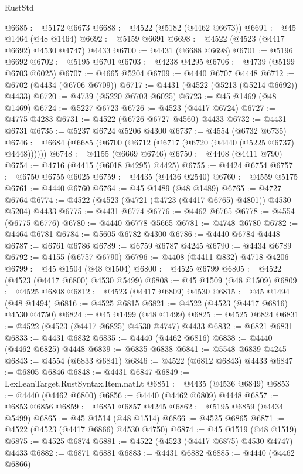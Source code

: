 \begin{lexlean}{RustStd}
\begin{coremodule}
{\begin{coremodule}
{{{{{{{{{{{{{{{{{{{{{{{{{{{{{{{{{{{{{{{{{{{{{{{{{{{{{{{{{{{{@6685 := @5172 @6673
@6688 := @4522 (@5182 (@4462 @6673))
@6691 := @45 @1464 (@48 @1464)
@6692 := @5159 @6691
@6698 := @4522 (@4523 (@4417 @6692) @4530 @4747) @4433
@6700 := @4431 (@6688 @6698)
@6701 := @5196 @6692
@6702 := @5195 @6701
@6703 := @4238 @4295
@6706 := @4739 (@5199 @6703 @6025)
@6707 := @4665 @5204
@6709 := @4440 @6707 @4448
@6712 := @6702 (@4434 (@6706 @6709))
@6717 := @4431 (@4522 (@5213 (@5214 @6692)) @4433)
@6720 := @4739 (@5220 @6703 @6025)
@6723 := @45 @1469 (@48 @1469)
@6724 := @5227 @6723
@6726 := @4523 (@4417 @6724)
@6727 := @4775 @4283
@6731 := @4522 (@6726 @6727 @4560) @4433
@6732 := @4431 @6731
@6735 := @5237 @6724 @5206 @4300
@6737 := @4554 (@6732 @6735)
@6746 := @6684 (@6685 (@6700 (@6712 (@6717 (@6720 (@4440 (@5225 @6737) @4448))))))
@6748 := @4155 (@6669 @6746)
@6750 := @4408 (@4411 @790)
@6754 := @4716 (@4415 (@6018 @4295) @4425)
@6755 := @4424 @6754
@6757 := @6750 @6755 @6025
@6759 := @4435 (@4436 @2540)
@6760 := @4559 @5175
@6761 := @4440 @6760
@6764 := @45 @1489 (@48 @1489)
@6765 := @4727 @6764
@6774 := @4522 (@4523 (@4721 (@4723 (@4417 @6765) @4801)) @4530 @5204) @4433
@6775 := @4431 @6774
@6776 := @4462 @6765
@6778 := @4554 (@6775 @6776)
@6780 := @4440 @6778 @5665
@6781 := @4748 @6780
@6782 := @4464 @6781
@6784 := @5605 @6782 @4300
@6786 := @4440 @6784 @4448
@6787 := @6761 @6786
@6789 := @6759 @6787 @4245
@6790 := @4434 @6789
@6792 := @4155 (@6757 @6790)
@6796 := @4408 (@4411 @832) @4718 @4206
@6799 := @45 @1504 (@48 @1504)
@6800 := @4525 @6799
@6805 := @4522 (@4523 (@4417 @6800) @4530 @5499)
@6808 := @45 @1509 (@48 @1509)
@6809 := @4525 @6808
@6812 := @4523 (@4417 @6809) @4530
@6815 := @45 @1494 (@48 @1494)
@6816 := @4525 @6815
@6821 := @4522 (@4523 (@4417 @6816) @4530 @4750)
@6824 := @45 @1499 (@48 @1499)
@6825 := @4525 @6824
@6831 := @4522 (@4523 (@4417 @6825) @4530 @4747) @4433
@6832 := @6821 @6831
@6833 := @4431 @6832
@6835 := @4440 (@4462 @6816)
@6838 := @4440 (@4462 @6825) @4448
@6839 := @6835 @6838
@6841 := @5548 @6839 @4245
@6843 := @4554 (@6833 @6841)
@6846 := @4522 (@6812 @6843) @4433
@6847 := @6805 @6846
@6848 := @4431 @6847
@6849 := LexLeanTarget.RustSyntax.Item.natLt
@6851 := @4435 (@4536 @6849)
@6853 := @4440 (@4462 @6800)
@6856 := @4440 (@4462 @6809) @4448
@6857 := @6853 @6856
@6859 := @6851 @6857 @4245
@6862 := @5195 @6859 (@4434 @5499)
@6865 := @45 @1514 (@48 @1514)
@6866 := @4525 @6865
@6871 := @4522 (@4523 (@4417 @6866) @4530 @4750)
@6874 := @45 @1519 (@48 @1519)
@6875 := @4525 @6874
@6881 := @4522 (@4523 (@4417 @6875) @4530 @4747) @4433
@6882 := @6871 @6881
@6883 := @4431 @6882
@6885 := @4440 (@4462 @6866)
}}}}}}}}}}}}}}}}}}}}}}}}}}}}}}}}}}}}}}}}}}}}}}}}}}}}}}}}}}}}
\end{coremodule}}
\end{coremodule}
\end{lexlean}
